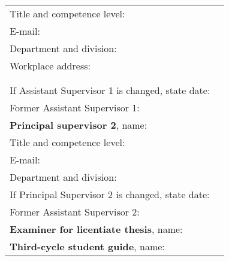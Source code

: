 \begin{tabular}{p{8.5cm}p{6.5cm}}
\hspace{.7cm} Title and competence level: &\cellcolor[gray]{0.95}                         \\
\hspace{.7cm} E-mail:                     &\cellcolor[gray]{0.95}                         \\
\hspace{.7cm} Department and division:    &\cellcolor[gray]{0.95}                         \\
\hspace{.7cm} Workplace address:          &\cellcolor[gray]{0.95} 						  \\
\hspace{.7cm}                             &\cellcolor[gray]{0.95}                         \\
\hspace{.7cm}                             &\cellcolor[gray]{0.95} 						  \\
\hspace{.7cm} If Assistant Supervisor 1 is changed, state date:&\cellcolor[gray]{0.95}    \\
\hspace{.7cm} Former Assistant Supervisor 1:&\cellcolor[gray]{0.95}                       \\
%
\textbf{Principal supervisor 2}, name:      &\cellcolor[gray]{0.95}\bf                    \\
\hspace{.7cm} Title and competence level: &\cellcolor[gray]{0.95}                         \\
\hspace{.7cm} E-mail:                     &\cellcolor[gray]{0.95}                         \\
\hspace{.7cm} Department and division:    &\cellcolor[gray]{0.95}                         \\
\hspace{.7cm} If Principal Supervisor 2 is changed, state date:&\cellcolor[gray]{0.95}    \\
\hspace{.7cm} Former Assistant Supervisor 2:&\cellcolor[gray]{0.95}                       \\
%
\textbf{Examiner for licentiate thesis}, name:& \cellcolor[gray]{0.95}\bf                 \\
\textbf{Third-cycle student guide}, name:& \cellcolor[gray]{0.95}\bf                      \\

\end{tabular}
